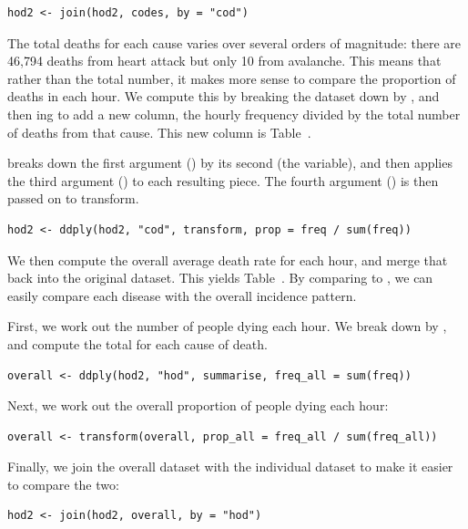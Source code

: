\documentclass[article]{jss}
\begin{document}
\begin{Verbatim}
hod2 <- join(hod2, codes, by = "cod")
\end{Verbatim}

The total deaths for each cause varies over several orders of magnitude: there are 46,794 deaths from heart attack but only 10 from avalanche. This means that rather than the total number, it makes more sense to compare the proportion of deaths in each hour. We compute this by breaking the dataset down by , and then ing to add a new  column, the hourly frequency divided by the total number of deaths from that cause. This new column is Table~.

 breaks down the first argument () by its second (the  variable), and then applies the third argument () to each resulting piece. The fourth argument () is then passed on to transform.

\begin{Verbatim}
hod2 <- ddply(hod2, "cod", transform, prop = freq / sum(freq))
\end{Verbatim}

We then compute the overall average death rate for each hour, and merge that back into the original dataset. This yields Table~. By comparing  to , we can easily compare each disease with the overall incidence pattern.

First, we work out the number of people dying each hour.  We break down  by , and compute the total for each cause of death.

\begin{Verbatim}
overall <- ddply(hod2, "hod", summarise, freq_all = sum(freq))
\end{Verbatim}

Next, we work out the overall proportion of people dying each hour:

\begin{Verbatim}
overall <- transform(overall, prop_all = freq_all / sum(freq_all))
\end{Verbatim}

Finally, we join the overall dataset with the individual dataset to make it easier to compare the two:

\begin{Verbatim}
hod2 <- join(hod2, overall, by = "hod")
\end{Verbatim}
\end{document}

